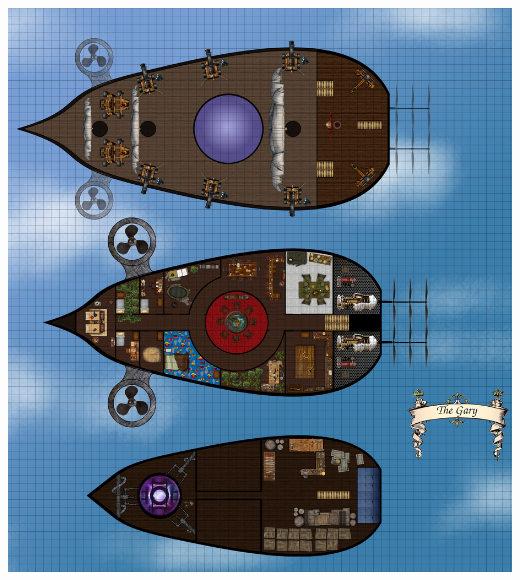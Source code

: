 \begin{center}
\includegraphics[width=180mm]{./content/img/theGaryMap.jpg}
\begin{figure}[h]
\end{figure}
\end{center}

\twocolumn

\clearpage